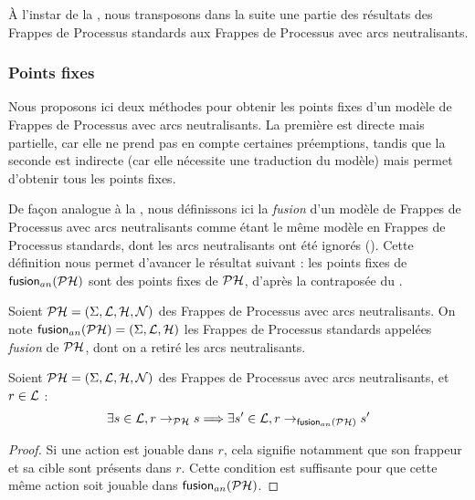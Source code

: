 

À l'instar de la , nous transposons dans la suite une partie des résultats
des Frappes de Processus standards aux Frappes de Processus avec arcs neutralisants.

\subsubsection{Points fixes}

Nous proposons ici deux méthodes pour obtenir les points fixes d'un modèle de Frappes de Processus
avec arcs neutralisants.
La première est directe mais partielle, car elle ne prend pas en compte certaines préemptions,
tandis que la seconde est indirecte (car elle nécessite une traduction du modèle)
mais permet d'obtenir tous les points fixes.

\myskip

De façon analogue à la , nous définissons ici
la \emph{fusion} d'un modèle de Frappes de Processus avec arcs neutralisants
comme étant le même modèle en Frappes de Processus standards,
dont les arcs neutralisants ont été ignorés ().
Cette définition nous permet d'avancer le résultat suivant :
les points fixes de $\mathsf{fusion}_{an}(\mathcal{PH})$ sont des points fixes de $\mathcal{PH}$,
d'après la contraposée du .

\begin{definition}
  Soient $\mathcal{PH} = (\Sigma, \mathcal{L}, \mathcal{H}, \mathcal{N})$ des Frappes de Processus avec arcs neutralisants.
  On note $\mathsf{fusion}_{an}(\mathcal{PH}) = (\Sigma, \mathcal{L}, \mathcal{H})$
  les Frappes de Processus standards appelées \emph{fusion} de $\mathcal{PH}$,
  dont on a retiré les arcs neutralisants.
\end{definition}

\begin{theorem}
  Soient $\mathcal{PH} = (\Sigma, \mathcal{L}, \mathcal{H}, \mathcal{N})$ des Frappes de Processus avec arcs neutralisants,
  et $r \in \mathcal{L}$ :
  \[\exists s \in \mathcal{L}, r \rightarrow_{\mathcal{PH}} s \Longrightarrow
    \exists s' \in \mathcal{L}, r \rightarrow_{\mathsf{fusion}_{an}(\mathcal{PH})} s'\]
\end{theorem}

\begin{proof}
  Si une action est jouable dans $r$, cela signifie notamment
  que son frappeur et sa cible sont présents dans $r$.
  Cette condition est suffisante pour que cette même action soit jouable dans $\mathsf{fusion}_{an}(\mathcal{PH})$.
\end{proof}

